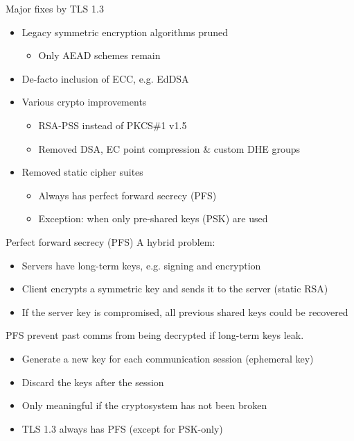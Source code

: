\begin{frame}{Major fixes by TLS 1.3}
  \begin{itemize}[<+(1)->]
    \item Legacy symmetric encryption algorithms pruned
    \begin{itemize}
      \item Only AEAD schemes remain
    \end{itemize}
    \item De-facto inclusion of ECC, e.g. EdDSA
    \item Various crypto improvements
    \begin{itemize}
      \item RSA-PSS instead of PKCS\#1 v1.5
      \item Removed DSA, EC point compression \& custom DHE groups
    \end{itemize}
    \item Removed static cipher suites
    \begin{itemize}
      \item Always has perfect forward secrecy (PFS)
      \item Exception: when only pre-shared keys (PSK) are used
    \end{itemize}
  \end{itemize}
\end{frame}

\begin{frame}{Perfect forward secrecy (PFS)}
  A hybrid problem:
  \begin{itemize}[<+(1)->]
    \item Servers have long-term keys, e.g. signing and encryption
    \item Client encrypts a symmetric key and sends it to the server (static RSA)
    \item If the server key is compromised, all previous shared keys could be recovered
  \end{itemize}

  \vspace*{1em}

  \pause
  PFS prevent past comms from being decrypted if long-term keys leak.
  \begin{itemize}[<+(1)->]
    \item Generate a new key for each communication session (ephemeral key)
    \item Discard the keys after the session
    \item Only meaningful if the cryptosystem has not been broken
    \item TLS 1.3 always has PFS (except for PSK-only)
  \end{itemize}
\end{frame}

